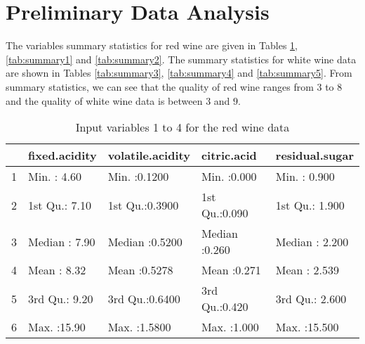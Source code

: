 \documentclass[12pt]{article}
\begin{document}
\section{Preliminary Data Analysis}
The variables summary statistics for red wine are given in Tables \ref{tab:summary0}, \ref{tab:summary1} and
\ref{tab:summary2}. The summary statistics for white wine data are shown in Tables \ref{tab:summary3},
\ref{tab:summary4} and \ref{tab:summary5}. From summary statistics, we can see that the quality of red wine ranges from $3$ to $8$ and the quality of white wine data is between $3$ and $9.$
\begin{center}
\begin{table}[htbp]
\centering
\begin{tabular}{rllll}
  \hline
 & fixed.acidity & volatile.acidity &  citric.acid & residual.sugar \\
  \hline
1 & Min.   : 4.60   & Min.   :0.1200   & Min.   :0.000   & Min.   : 0.900   \\
  2 & 1st Qu.: 7.10   & 1st Qu.:0.3900   & 1st Qu.:0.090   & 1st Qu.: 1.900   \\
  3 & Median : 7.90   & Median :0.5200   & Median :0.260   & Median : 2.200   \\
  4 & Mean   : 8.32   & Mean   :0.5278   & Mean   :0.271   & Mean   : 2.539   \\
  5 & 3rd Qu.: 9.20   & 3rd Qu.:0.6400   & 3rd Qu.:0.420   & 3rd Qu.: 2.600   \\
  6 & Max.   :15.90   & Max.   :1.5800   & Max.   :1.000   & Max.   :15.500   \\
   \hline
\end{tabular}
\caption{Input variables 1 to 4 for the red wine data}
\label{tab:summary0}
\end{table}
\end{center}
\end{document}
